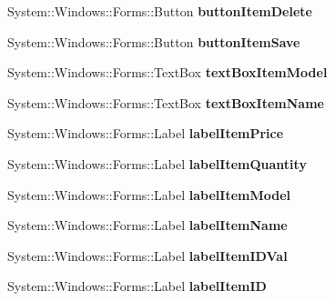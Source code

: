 \begin{DoxyCompactItemize}
System\+::\+Windows\+::\+Forms\+::\+Button {\bfseries button\+Item\+Delete}
\item 
\hypertarget{class_magazyn_1_1_magazin_a78cdd43ba24cbbf92dcc748e85affeb2}{}\label{class_magazyn_1_1_magazin_a78cdd43ba24cbbf92dcc748e85affeb2} 
System\+::\+Windows\+::\+Forms\+::\+Button {\bfseries button\+Item\+Save}
\item 
\hypertarget{class_magazyn_1_1_magazin_a19bb433da2f79aa09b394c128b4afbe0}{}\label{class_magazyn_1_1_magazin_a19bb433da2f79aa09b394c128b4afbe0} 
System\+::\+Windows\+::\+Forms\+::\+Text\+Box {\bfseries text\+Box\+Item\+Model}
\item 
\hypertarget{class_magazyn_1_1_magazin_a288d85866ef8d708690d59622c3ab516}{}\label{class_magazyn_1_1_magazin_a288d85866ef8d708690d59622c3ab516} 
System\+::\+Windows\+::\+Forms\+::\+Text\+Box {\bfseries text\+Box\+Item\+Name}
\item 
\hypertarget{class_magazyn_1_1_magazin_ade14e2c05fef8f6afacb7f4eda487e6b}{}\label{class_magazyn_1_1_magazin_ade14e2c05fef8f6afacb7f4eda487e6b} 
System\+::\+Windows\+::\+Forms\+::\+Label {\bfseries label\+Item\+Price}
\item 
\hypertarget{class_magazyn_1_1_magazin_a94837dbbf3bb66b032895bc9dd2b6e7a}{}\label{class_magazyn_1_1_magazin_a94837dbbf3bb66b032895bc9dd2b6e7a} 
System\+::\+Windows\+::\+Forms\+::\+Label {\bfseries label\+Item\+Quantity}
\item 
\hypertarget{class_magazyn_1_1_magazin_a9719a509ec8bb96edda335f81ef0b5b5}{}\label{class_magazyn_1_1_magazin_a9719a509ec8bb96edda335f81ef0b5b5} 
System\+::\+Windows\+::\+Forms\+::\+Label {\bfseries label\+Item\+Model}
\item 
\hypertarget{class_magazyn_1_1_magazin_a404f147b839fab837b465dbffd2dd7d1}{}\label{class_magazyn_1_1_magazin_a404f147b839fab837b465dbffd2dd7d1} 
System\+::\+Windows\+::\+Forms\+::\+Label {\bfseries label\+Item\+Name}
\item 
\hypertarget{class_magazyn_1_1_magazin_a7843a9c9f4955a7c4ecebe46ae77dfa3}{}\label{class_magazyn_1_1_magazin_a7843a9c9f4955a7c4ecebe46ae77dfa3} 
System\+::\+Windows\+::\+Forms\+::\+Label {\bfseries label\+Item\+I\+D\+Val}
\item 
\hypertarget{class_magazyn_1_1_magazin_a6722cf7342caec82e657139373924cb8}{}\label{class_magazyn_1_1_magazin_a6722cf7342caec82e657139373924cb8} 
System\+::\+Windows\+::\+Forms\+::\+Label {\bfseries label\+Item\+ID}
\item 
\hypertarget{class_magazyn_1_1_magazin_ab230c0e32cc539268b3d3576b73de686}{}\label{class_magazyn_1_1_magazin_ab230c0e32cc539268b3d3576b73de686} 

\end{DoxyCompactItemize}

